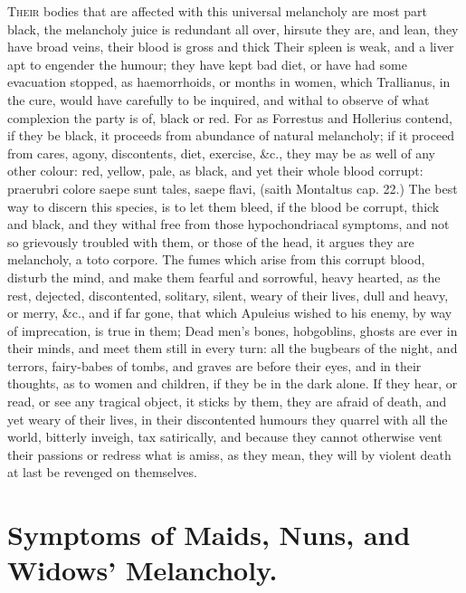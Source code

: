 {\lettrine{T}{heir} bodies that are affected with this universal melancholy are most
part black, the melancholy juice is redundant all over, hirsute
they are, and lean, they have broad veins, their blood is gross and
thick  Their spleen is weak, and a liver apt to engender the
humour; they have kept bad diet, or have had some evacuation stopped,
as haemorrhoids, or months in women, which Trallianus, in the
cure, would have carefully to be inquired, and withal to observe of
what complexion the party is of, black or red. For as Forrestus and
Hollerius contend, if they be black, it proceeds from abundance
of natural melancholy; if it proceed from cares, agony, discontents,
diet, exercise, \&c., they may be as well of any other colour: red,
yellow, pale, as black, and yet their whole blood corrupt: praerubri
colore saepe sunt tales, saepe flavi, (saith  Montaltus cap. 22.)
The best way to discern this species, is to let them bleed, if the
blood be corrupt, thick and black, and they withal free from those
hypochondriacal symptoms, and not so grievously troubled with them, or
those of the head, it argues they are melancholy, a toto corpore. The
fumes which arise from this corrupt blood, disturb the mind, and make
them fearful and sorrowful, heavy hearted, as the rest, dejected,
discontented, solitary, silent, weary of their lives, dull and heavy,
or merry, \&c., and if far gone, that which Apuleius wished to his
enemy, by way of imprecation, is true in them; Dead men's bones,
hobgoblins, ghosts are ever in their minds, and meet them still in
every turn: all the bugbears of the night, and terrors, fairy-babes of
tombs, and graves are before their eyes, and in their thoughts, as to
women and children, if they be in the dark alone. If they hear, or
read, or see any tragical object, it sticks by them, they are afraid of
death, and yet weary of their lives, in their discontented humours they
quarrel with all the world, bitterly inveigh, tax satirically, and
because they cannot otherwise vent their passions or redress what is
amiss, as they mean, they will by violent death at last be revenged on
themselves.

\section{Symptoms of Maids, Nuns, and Widows' Melancholy.}

}
